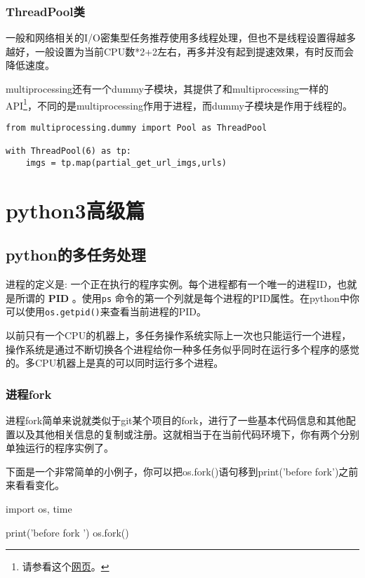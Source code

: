 \documentclass[12pt,oneside]{book}
\begin{document}
\begin{common-format}
\section{ThreadPool类}
一般和网络相关的I/O密集型任务推荐使用多线程处理，但也不是线程设置得越多越好，一般设置为当前CPU数*2+2左右，再多并没有起到提速效果，有时反而会降低速度。

multiprocessing还有一个dummy子模块，其提供了和multiprocessing一样的API\footnote{请参看这个\href{http://segmentfault.com/blog/caspar/1190000000414339b}{网页}。}，不同的是multiprocessing作用于进程，而dummy子模块是作用于线程的。


\begin{Verbatim}
from multiprocessing.dummy import Pool as ThreadPool

with ThreadPool(6) as tp:
    imgs = tp.map(partial_get_url_imgs,urls)
\end{Verbatim}



\part{python3高级篇}

\chapter{python的多任务处理}

进程的定义是: 一个正在执行的程序实例。每个进程都有一个唯一的进程ID，也就是所谓的 \textbf{PID} 。使用\verb+ps+ 命令的第一个列就是每个进程的PID属性。在python中你可以使用\verb+os.getpid()+来查看当前进程的PID。

以前只有一个CPU的机器上，多任务操作系统实际上一次也只能运行一个进程，操作系统是通过不断切换各个进程给你一种多任务似乎同时在运行多个程序的感觉的。多CPU机器上是真的可以同时运行多个进程。

\section{进程fork}
进程fork简单来说就类似于git某个项目的fork，进行了一些基本代码信息和其他配置以及其他相关信息的复制或注册。这就相当于在当前代码环境下，你有两个分别单独运行的程序实例了。

下面是一个非常简单的小例子，你可以把os.fork()语句移到print('before fork')之前来看看变化。

\begin{tcbpython}[]
import os, time

print('before fork ')
os.fork()


\end{tcbpython}
\end{common-format}
\end{document}
